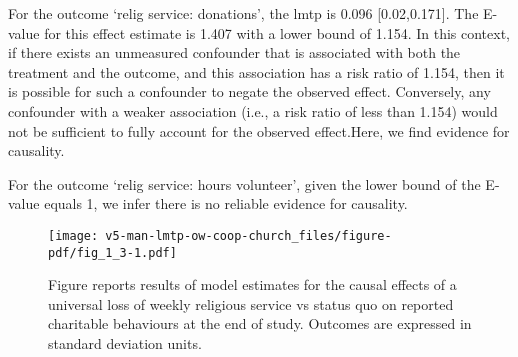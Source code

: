 \documentclass[
  singlecolumn]{article}
\begin{document}
For the outcome `relig service: donations', the lmtp is 0.096
{[}0.02,0.171{]}. The E-value for this effect estimate is 1.407 with a
lower bound of 1.154. In this context, if there exists an unmeasured
confounder that is associated with both the treatment and the outcome,
and this association has a risk ratio of 1.154, then it is possible for
such a confounder to negate the observed effect. Conversely, any
confounder with a weaker association (i.e., a risk ratio of less than
1.154) would not be sufficient to fully account for the observed
effect.Here, we find evidence for causality.

For the outcome `relig service: hours volunteer', given the lower bound
of the E-value equals 1, we infer there is no reliable evidence for
causality.

\newpage{}

\begin{figure}[H]

{\centering \texttt{[image: v5-man-lmtp-ow-coop-church\_files/figure-pdf/fig\_1\_3-1.pdf]}

}

\caption{Figure reports results of model estimates for the causal
effects of a universal loss of weekly religious service vs status quo on
reported charitable behaviours at the end of study. Outcomes are
expressed in standard deviation units.}

\end{figure}%
\end{document}
